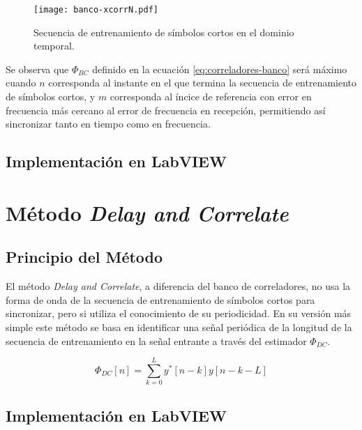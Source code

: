 \begin{figure}[ht]
    \centering{}\texttt{[image: banco-xcorrN.pdf]}
    \caption{Secuencia de entrenamiento de símbolos cortos en el dominio temporal.\label{fig:banco-xcorrN}}  
\end{figure}

Se observa que $\Phi_{BC}$ definido en la ecuación \ref{eq:correladores-banco} será máximo cuando $n$ corresponda al instante en el que termina la secuencia de entrenamiento de símbolos cortos, y $m$ corresponda al íncice de referencia con error en frecuencia más cercano al error de frecuencia en recepción, permitiendo así sincronizar tanto en tiempo como en frecuencia.

\subsection{Implementación en LabVIEW}
\label{Ss:ch3-banco-labview}

\section{Método \textit{Delay and Correlate}}
\label{S:ch3-dac}

\subsection{Principio del Método}
\label{Ss:ch3-dac-principio}

El método \textit{Delay and Correlate}, a diferencia del banco de correladores, no usa la forma de onda de la secuencia de entrenamiento de símbolos cortos para sincronizar, pero si utiliza el conocimiento de su periodicidad. En su versión más simple este método se basa en identificar una señal periódica de la longitud de la secuencia de entrenamiento en la señal entrante a través del estimador $\Phi_{DC}$.

\begin{equation}
    \Phi_{DC}[n] = \sum_{k=0}^{L}y^\ast[n-k]y[n-k-L]
\end{equation}

\subsection{Implementación en LabVIEW}
\label{Ss:ch3-dac-labview}


